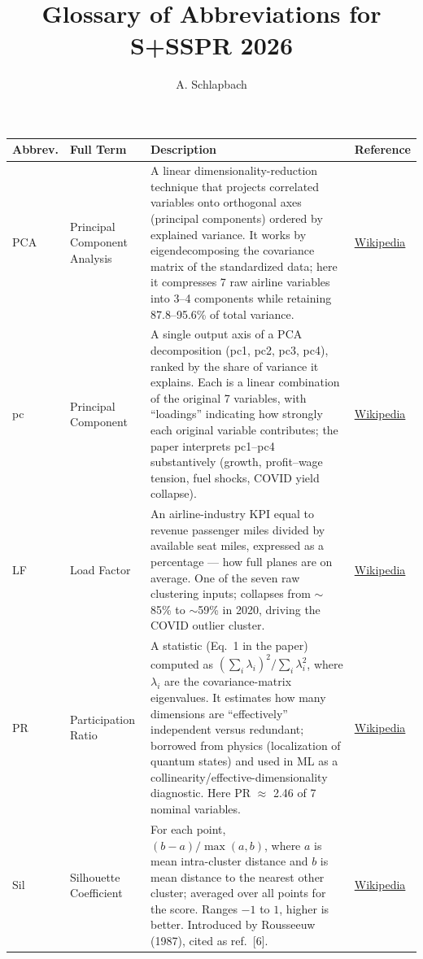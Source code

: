 \documentclass[10pt]{article}
\title{Glossary of Abbreviations for S+SSPR 2026}
\author{A. Schlapbach}
\date{}
\begin{document}
\begin{longtable}{P{2cm} P{3cm} P{9cm} P{2cm}}
\toprule
\textbf{Abbrev.} & \textbf{Full Term} & \textbf{Description} & \textbf{Reference} \\
\midrule
\endhead

PCA & Principal Component Analysis &
A linear dimensionality-reduction technique that projects correlated variables onto orthogonal axes (principal components) ordered by explained variance. It works by eigendecomposing the covariance matrix of the standardized data; here it compresses 7 raw airline variables into 3--4 components while retaining 87.8--95.6\% of total variance. &
\href{https://en.wikipedia.org/wiki/Principal_component_analysis}{Wikipedia} \\

pc & Principal Component &
A single output axis of a PCA decomposition (pc1, pc2, pc3, pc4), ranked by the share of variance it explains. Each is a linear combination of the original 7 variables, with ``loadings'' indicating how strongly each original variable contributes; the paper interprets pc1--pc4 substantively (growth, profit--wage tension, fuel shocks, COVID yield collapse). &
\href{https://en.wikipedia.org/wiki/Principal_component_analysis#Details}{Wikipedia} \\

LF & Load Factor &
An airline-industry KPI equal to revenue passenger miles divided by available seat miles, expressed as a percentage --- how full planes are on average. One of the seven raw clustering inputs; collapses from $\sim$85\% to $\sim$59\% in 2020, driving the COVID outlier cluster. &
\href{https://en.wikipedia.org/wiki/Load_factor_(aeronautics)}{Wikipedia} \\

PR & Participation Ratio &
A statistic (Eq.~1 in the paper) computed as $(\sum_i \lambda_i)^2 / \sum_i \lambda_i^2$, where $\lambda_i$ are the covariance-matrix eigenvalues. It estimates how many dimensions are ``effectively'' independent versus redundant; borrowed from physics (localization of quantum states) and used in ML as a collinearity/effective-dimensionality diagnostic. Here PR $\approx$ 2.46 of 7 nominal variables. &
\href{https://en.wikipedia.org/wiki/Anderson_localization#Inverse_participation_ratio}{Wikipedia} \\

Sil & Silhouette Coefficient &
For each point, $(b - a)/\max(a,b)$, where $a$ is mean intra-cluster distance and $b$ is mean distance to the nearest other cluster; averaged over all points for the score. Ranges $-1$ to $1$, higher is better. Introduced by Rousseeuw (1987), cited as ref.~[6]. &
\href{https://en.wikipedia.org/wiki/Silhouette_(clustering)}{Wikipedia} \\


\end{longtable}
\end{document}
